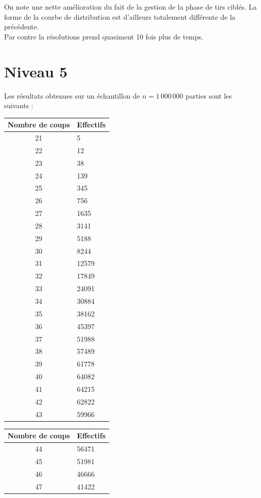 On note une nette amélioration du fait de la gestion de la phase de tirs ciblés. La forme de la courbe de distribution est d'ailleurs totalement différente de la précédente.\\
Par contre la résolutions prend quasiment 10 fois plus de temps.
\newpage
\section{Niveau 5}
Les résultats obtenues sur un échantillon de $n=1\,000\,000$ parties sont les suivants :
\begin{center}
\begin{tabular}[t]{|c|l|}
\hline
Nombre de coups & Effectifs\\
\hline
21 & 5\\
\hline
22 & 12\\
\hline
23 & 38\\
\hline
24 & 139\\
\hline
25 & 345\\
\hline
26 & 756\\
\hline
27 & 1635\\
\hline
28 & 3141\\
\hline
29 & 5188\\
\hline
30 & 8244\\
\hline
31 & 12579\\
\hline
32 & 17849\\
\hline
33 & 24091\\
\hline
34 & 30884\\
\hline
35 & 38162\\
\hline
36 & 45397\\
\hline
37 & 51988\\
\hline
38 & 57489\\
\hline
39 & 61778\\
\hline
40 & 64082\\
\hline
41 & 64215\\
\hline
42 & 62822\\
\hline
43 & 59966\\
\hline
\end{tabular}\hspace{0.5cm}
\begin{tabular}[t]{|c|l|}
\hline
Nombre de coups & Effectifs\\
\hline
44 & 56471\\
\hline
45 & 51981\\
\hline
46 & 46666\\
\hline
47 & 41422\\

\end{tabular}
\end{center}
